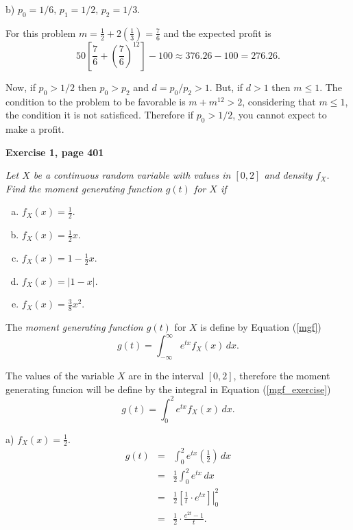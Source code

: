 \documentclass[12pt]{article}
\begin{document}
	\noindent b) $p_0 = 1/6, \, p_1 = 1/2, \, p_2 = 1/3$.
	
	For this problem $m = \frac{1}{2}+ 2\left(\frac{1}{3}\right) = \frac{7}{6}$ and the expected profit is $$50 \left[ \frac{7}{6}+\left(\frac{7}{6} \right)^{12} \right]-100 \approx 376.26 - 100 = 276.26.$$
	
	Now, if $p_0 > 1 / 2$ then $p_0 > p_2$ and $d = p_0/p_2 > 1$. But, if $d>1$ then $m\leq1$. The condition to the problem to be favorable is $m + m^{12} > 2$, considering that $m\leq1$, the condition it is not satisficed. Therefore if $p_0 > 1 / 2$, you cannot expect to make a profit.

	{\bf Exercise 1, page 401}
	
	{\em Let $X$ be a continuous random variable with values in $[0,2]$ and density $f_X$. Find the moment generating function $g(t)$ for $X$ if
		\begin{enumerate}[a)]
			\item $f_X(x) = \frac{1}{2}$.
			\item $f_X (x) = \frac{1}{2}x$.
			\item $f_X (x) = 1 - \frac{1}{2}x$.
			\item $f_X (x) = |1 - x|$.
			\item $f_X (x) = \frac{3}{8}x^2$.
		\end{enumerate}
	}
	
	The {\em moment generating function $g(t)$} for $X$ is define by Equation (\ref{mgf})
	\begin{equation}
	g(t) = \int_{-\infty}^{\infty} e^{tx} f_X(x) \, dx.
	\label{mgf}
	\end{equation}
	
	The values of the variable $X$ are in the interval $[0,2]$, therefore the moment generating funcion will be define by the integral in Equation (\ref{mgf_exercise}) 
	\begin{equation}
		g(t) = \int_{0}^{2} e^{tx} f_X(x) \, dx.
	\label{mgf_exercise}
	\end{equation}
	
	\noindent a) $f_X(x) = \frac{1}{2}$.
	\begin{eqnarray*}
		g(t) &=& \int_{0}^{2} e^{tx} \left(\frac{1}{2}\right)\, dx \\
		&=& \frac{1}{2} \int_{0}^{2} e^{tx} \, dx \\
		&=& \frac{1}{2} \left. \left[ \frac{1}{t} \cdot e^{tx} \right] \right|_{0}^{2} \\
		&=& \frac{1}{2}	\cdot \frac{e^{2t}-1}{t}.
	\end{eqnarray*}
\end{document}
